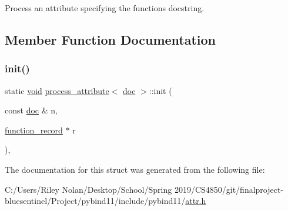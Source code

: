 Process an attribute specifying the function\textquotesingle{}s docstring. 

\subsection{Member Function Documentation}
\mbox{\label{structprocess__attribute_3_01doc_01_4_aaa3436fb4a2436f7dbbb1d3259c17ae0}} 
\subsubsection{\texorpdfstring{init()}{init()}}
{\footnotesize\ttfamily static \mbox{\hyperlink{_s_d_l__opengles2__gl2ext_8h_ae5d8fa23ad07c48bb609509eae494c95}{void}} \mbox{\hyperlink{structprocess__attribute}{process\+\_\+attribute}}$<$ \mbox{\hyperlink{structdoc}{doc}} $>$\+::init (\begin{DoxyParamCaption}\item[{const \mbox{\hyperlink{structdoc}{doc}} \&}]{n,  }\item[{\mbox{\hyperlink{structfunction__record}{function\+\_\+record}} $\ast$}]{r }\end{DoxyParamCaption})\hspace{0.3cm}{\ttfamily [inline]}, {\ttfamily [static]}}



The documentation for this struct was generated from the following file\+:\begin{DoxyCompactItemize}
\item 
C\+:/\+Users/\+Riley Nolan/\+Desktop/\+School/\+Spring 2019/\+C\+S4850/git/finalproject-\/bluesentinel/\+Project/pybind11/include/pybind11/\mbox{\hyperlink{attr_8h}{attr.\+h}}\end{DoxyCompactItemize}
